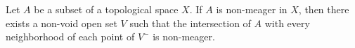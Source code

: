 \begin{proposition}
Let $A$ be a subset of a topological space $X$. If $A$ is non-meager in $X$, then there exists a non-void open set $V$ such that the intersection of $A$ with every neighborhood of each point of $V^{-}$ is non-meager.
\end{proposition}
